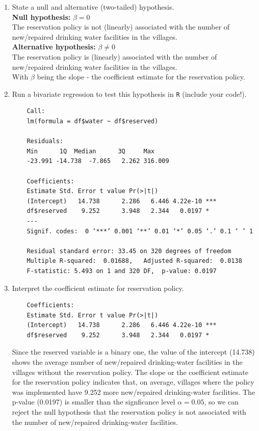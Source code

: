 \documentclass[12pt,letterpaper]{article}
\begin{document}
\newpage
\begin{enumerate}
	\item [(a)] State a null and alternative (two-tailed) hypothesis. \\ [0.5 cm]
	\textbf{Null hypothesis:} $\beta = 0$ \\
	The reservation policy is not (linearly) associated with the number of new/repaired drinking water facilities in the villages. \\ [0.3cm]
	\textbf{Alternative hypothesis:} $\beta \neq 0$ \\
	The reservation policy is (linearly) associated with the number of new/repaired drinking water facilities in the villages. \\ [0.3cm]
	With $\beta$ being the slope - the coefficient estimate for the reservation policy. 
	
	\vspace{0.5cm}
	\item [(b)] Run a bivariate regression to test this hypothesis in \texttt{R} (include your code!).

\begin{verbatim}
	Call:
	lm(formula = df$water ~ df$reserved)
	
	Residuals:
	Min      1Q  Median      3Q     Max 
	-23.991 -14.738  -7.865   2.262 316.009 
	
	Coefficients:
	Estimate Std. Error t value Pr(>|t|)    
	(Intercept)   14.738      2.286   6.446 4.22e-10 ***
	df$reserved    9.252      3.948   2.344   0.0197 *  
	---
	Signif. codes:  0 ‘***’ 0.001 ‘**’ 0.01 ‘*’ 0.05 ‘.’ 0.1 ‘ ’ 1
	
	Residual standard error: 33.45 on 320 degrees of freedom
	Multiple R-squared:  0.01688,	Adjusted R-squared:  0.0138 
	F-statistic: 5.493 on 1 and 320 DF,  p-value: 0.0197
\end{verbatim}
	\vspace{6cm}
	\item [(c)] Interpret the coefficient estimate for reservation policy. 
\begin{verbatim}
	Coefficients:
	Estimate Std. Error t value Pr(>|t|)    
	(Intercept)   14.738      2.286   6.446 4.22e-10 ***
	df$reserved    9.252      3.948   2.344   0.0197 *  
\end{verbatim}
	Since the reserved variable is a binary one, the value of the intercept (14.738) shows the average number of new/repaired drinking-water facilities in the villages without the reservation policy. The slope or the coefficient estimate for the reservation policy indicates that, on average, villages where the policy was implemented have 9.252 more new/repaired drinking-water facilities. The p-value (0.0197) is smaller than the signficance level $\alpha=0.05$, so we can reject the null hypothesis that the reservation policy is not associated with the number of new/repaired drinking-water facilities. 
\end{enumerate}
\end{document}
